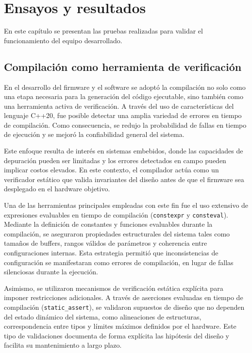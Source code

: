 
\chapter{Ensayos y resultados} %

\label{Chapter4} %
En este capítulo se presentan las pruebas realizadas para validar el funcionamiento del equipo desarrollado.


\section{Compilación como herramienta de verificación} %

En el desarrollo del firmware y el software se adoptó la compilación no solo como una etapa necesaria para la generación del código ejecutable, sino también como una herramienta activa de verificación. A través del uso de características del lenguaje C++20, fue posible detectar una amplia variedad de errores en tiempo de compilación. Como consecuencia, se redujo la probabilidad de fallas en tiempo de ejecución y se mejoró la confiabilidad general del sistema.

Este enfoque resulta de interés en sistemas embebidos, donde las capacidades de depuración pueden ser limitadas y los errores detectados en campo pueden implicar costos elevados. En este contexto, el compilador actúa como un verificador estático que valida invariantes del diseño antes de que el firmware sea desplegado en el hardware objetivo.

Una de las herramientas principales empleadas con este fin fue el uso extensivo de expresiones evaluables en tiempo de compilación (\texttt{constexpr} y \texttt{consteval}). Mediante la definición de constantes y funciones evaluables durante la compilación, se aseguraron propiedades estructurales del sistema tales como tamaños de buffers, rangos válidos de parámetros y coherencia entre configuraciones internas. Esta estrategia permitió que inconsistencias de configuración se manifestaran como errores de compilación, en lugar de fallas silenciosas durante la ejecución.

Asimismo, se utilizaron mecanismos de verificación estática explícita para imponer restricciones adicionales. A través de aserciones evaluadas en tiempo de compilación (\texttt{static\_assert}), se validaron supuestos de diseño que no dependen del estado dinámico del sistema, como alineaciones de estructuras, correspondencia entre tipos y límites máximos definidos por el hardware. Este tipo de validaciones documenta de forma explícita las hipótesis del diseño y facilita su mantenimiento a largo plazo.

